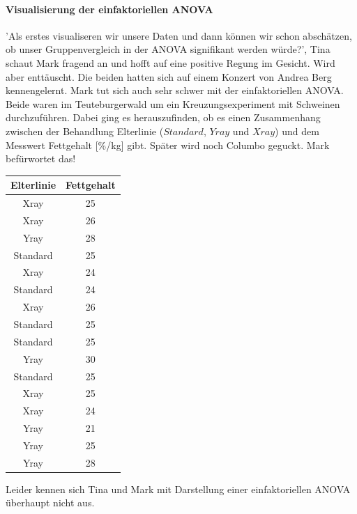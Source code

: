 \documentclass[a4paper, 9pt]{scrartcl}\usepackage[]{graphicx}\usepackage[]{xcolor}
\newenvironment{knitrout}{}{} %
\begin{document}
\ifcollection
\paragraph{Visualisierung der einfaktoriellen ANOVA}
\fi

'Als erstes visualiseren wir unsere Daten und dann können wir schon abschätzen, ob unser Gruppenvergleich in der ANOVA signifikant werden würde?', Tina schaut Mark fragend an und hofft auf eine positive Regung im Gesicht. Wird aber enttäuscht. Die beiden hatten sich auf einem Konzert von Andrea Berg kennengelernt. Mark tut sich auch sehr schwer mit der einfaktoriellen ANOVA. Beide waren im Teuteburgerwald um ein Kreuzungsexperiment mit Schweinen durchzuführen. Dabei ging es herauszufinden, ob es einen Zusammenhang zwischen der Behandlung Elterlinie ($Standard$, $Yray$ und $Xray$) und dem Messwert Fettgehalt [\%/kg] gibt. Später wird noch Columbo geguckt. Mark befürwortet das!

\begin{knitrout}
\color{fgcolor}\begin{table}[!h]
\centering
\begin{tabular}{cc}
\toprule
Elterlinie & Fettgehalt\\
\midrule
Xray & 25\\
Xray & 26\\
Yray & 28\\
Standard & 25\\
Xray & 24\\
\addlinespace
Standard & 24\\
Xray & 26\\
Standard & 25\\
Standard & 25\\
Yray & 30\\
\addlinespace
Standard & 25\\
Xray & 25\\
Xray & 24\\
Yray & 21\\
Yray & 25\\
\addlinespace
Yray & 28\\
\bottomrule
\end{tabular}
\end{table}

\end{knitrout}

Leider kennen sich Tina und Mark mit Darstellung einer einfaktoriellen ANOVA überhaupt nicht aus. 
\end{document}
